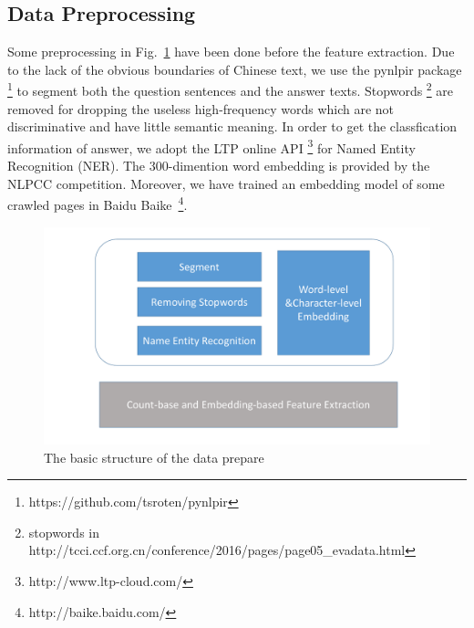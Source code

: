 \documentclass{llncs}
\begin{document}


\subsection{Data Preprocessing}
\label{sec:preprocess}
Some preprocessing in Fig.~\ref{fig:structure} have been done before the feature extraction. 
Due to the lack of the obvious boundaries of Chinese text, we use the pynlpir package \footnote{https://github.com/tsroten/pynlpir} \cite{Liu2010Language} to segment both the question sentences and the answer texts. Stopwords \footnote{stopwords in http://tcci.ccf.org.cn/conference/2016/pages/page05\_evadata.html} are removed for dropping the useless high-frequency words which are not discriminative and have little semantic meaning. In order to get the classfication information of answer, we adopt the LTP online API \footnote{http://www.ltp-cloud.com/} for Named Entity Recognition (NER). The 300-dimention word embedding is provided by the NLPCC competition. Moreover, we have trained an embedding model of some crawled pages in Baidu Baike~\footnote{http://baike.baidu.com/}. 
\begin{figure}
\centering
\includegraphics[width=12cm]{figures/structure.pdf}
\caption{The basic structure of the data prepare}
\label{fig:structure}
\end{figure}
\end{document}
